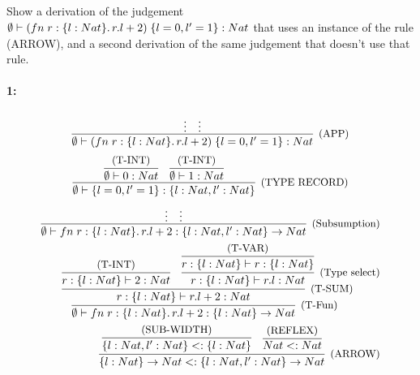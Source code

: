 \subsection{}

Show a derivation of the judgement
$\emptyset \vdash (fn\;r:\{l: Nat\}.\,r.l+2)\;\{l=0, l'=1\}: Nat$ that uses an
instance of the rule (ARROW), and a second derivation of the same judgement that doesn't use that
rule.
\paragraph*{1:}
\[
	\infer[\text{\small{(APP)}}]
	{\emptyset \vdash \APP{(\FN{r:\TREC{l: Nat}}{\SEL{r}{l}+2})}{\REC{l=0, l'=1}}: Nat}
	{ \vdots & \vdots }
\]
\[
  \infer[\text{\small{(TYPE RECORD)}}]
	{\emptyset \vdash \REC{l=0, l'=1}: \TREC{l: Nat, l': Nat}}
	{
	\infer{\emptyset \vdash 0: Nat}{\text{\small{(T-INT)}}} &
		\infer{\emptyset \vdash 1: Nat}{\text{\small{(T-INT)}}}
	}
\]
\begin{align*}
	\infer[\text{\small{(Subsumption)}}]
	{\emptyset \vdash \FN{r:\TREC{l: Nat}}{\SEL{r}{l}+2}: \TREC{l: Nat, l': Nat} \to Nat }
	{ \vdots & \vdots }\\
  \infer[\text{\small{(T-Fun)}}]
  {\emptyset \vdash \FN{r:\TREC{l: Nat}}{\SEL{r}{l}+2}: \TREC{l: Nat} \to Nat}
  {
    \infer[\text{\small{(T-SUM)}}]
    { r:\TREC{l: Nat} \vdash \SEL{r}{l}+2: Nat }
    {
      \infer{r:\TREC{l: Nat} \vdash 2: Nat}{\text{\small{(T-INT)}}} &
      \infer[\text{\small{(Type select)}}]
      { r:\TREC{l: Nat} \vdash \SEL{r}{l}: Nat }
      {
        \infer
        {r:\TREC{l: Nat} \vdash r:\TREC{l: Nat}}
        {\text{\small{(T-VAR)}}}
      }
    }
  }\\
  \infer[\text{\small{(ARROW)}}]
  {\TREC{l: Nat} \to Nat <: \TREC{l: Nat, l': Nat} \to Nat}
  {
    \infer{\TREC{l: Nat, l': Nat} <: \TREC{l: Nat}}{\text{\small{(SUB-WIDTH)}}} &
    \infer{Nat <: Nat}{\text{\small{(REFLEX)}}}
  }
\end{align*}


